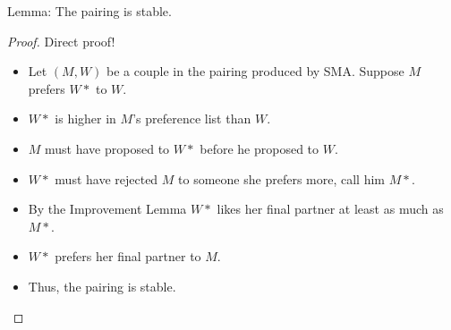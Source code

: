 \question Lemma: The pairing is stable.   \newline

\begin{solution}[3 in]
\begin{proof}  Direct proof!
\begin{itemize}
\item[] Let $(M, W)$ be a couple in the pairing produced by SMA. 
Suppose $M$ prefers $W*$ to $W$.
\item[] $W*$ is higher in $M$’s preference 
list than $W$.
\item[] $M$ must have proposed to $W*$ before he proposed to $W$.
\item[]  $W*$ must have rejected $M$ to someone she prefers more, 
call him $M*$.
\item[] By the Improvement Lemma $W*$ likes her final partner at 
least as much as $M*$.
\item[] $W*$ prefers her final partner to $M$.
\item[] Thus, the pairing is stable.
\end{itemize}
\end{proof}
\end{solution}